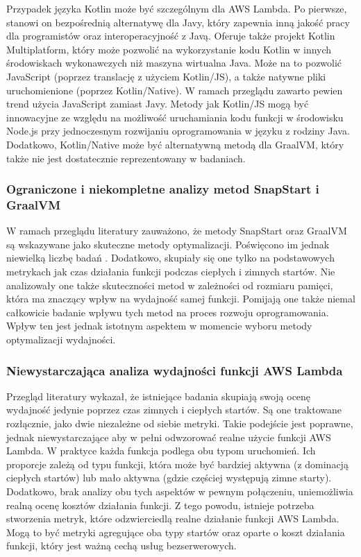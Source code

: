 Przypadek języka Kotlin może być szczególnym dla AWS Lambda.
Po pierwsze, stanowi on bezpośrednią alternatywę dla Javy, który zapewnia inną jakość pracy dla programistów oraz interoperacyjność z Javą.
Oferuje także projekt Kotlin Multiplatform, który może pozwolić na wykorzystanie kodu Kotlin w innych środowiskach wykonawczych niż maszyna wirtualna Java.
Może na to pozwolić JavaScript (poprzez translację z użyciem Kotlin/JS), a także natywne pliki uruchomienione (poprzez Kotlin/Native).
W ramach przeglądu zawarto pewien trend użycia JavaScript zamiast Javy.
Metody jak Kotlin/JS mogą być innowacyjne ze względu na możliwość uruchamiania kodu funkcji w środowisku Node.js przy jednoczesnym rozwijaniu oprogramowania w języku z rodziny Java.
Dodatkowo, Kotlin/Native może być alternatywną metodą dla GraalVM, który także nie jest dostatecznie reprezentowany w badaniach.

\subsubsection*{Ograniczone i niekompletne analizy metod SnapStart i GraalVM}

W ramach przeglądu literatury zauważono, że metody SnapStart oraz GraalVM są wskazywane jako skuteczne metody optymalizacji.
Poświęcono im jednak niewielką liczbę badań \cite{menéndez2023performancebestpracticesusing}\cite{ritzal2020optimizing}.
Dodatkowo, skupiały się one tylko na podstawowych metrykach jak czas działania funkcji podczas ciepłych i zimnych startów.
Nie analizowały one także skuteczności metod w zależności od rozmiaru pamięci, która ma znaczący wpływ na wydajność samej funkcji.
Pomijają one także niemal całkowicie badanie wpływu tych metod na proces rozwoju oprogramowania.
Wpływ ten jest jednak istotnym aspektem w momencie wyboru metody optymalizacji wydajności.

\subsubsection*{Niewystarczająca analiza wydajności funkcji AWS Lambda}

Przegląd literatury wykazał, że istniejące badania skupiają swoją ocenę wydajność jedynie poprzez czas zimnych i ciepłych startów.
Są one traktowane rozłącznie, jako dwie niezależne od siebie metryki.
Takie podejście jest poprawne, jednak niewystarczające aby w pełni odwzorować realne użycie funkcji AWS Lambda.
W praktyce każda funkcja podlega obu typom uruchomień.
Ich proporcje zależą od typu funkcji, która może być bardziej aktywna (z dominacją ciepłych startów) lub mało aktywna (gdzie częściej występują zimne starty).
Dodatkowo, brak analizy obu tych aspektów w pewnym połączeniu, uniemożliwia realną ocenę kosztów działania funkcji.
Z tego powodu, istnieje potrzeba stworzenia metryk, które odzwierciedlą realne działanie funkcji AWS Lambda.
Mogą to być metryki agregujące oba typy startów oraz oparte o koszt działania funkcji, który jest ważną cechą usług bezserwerowych.

